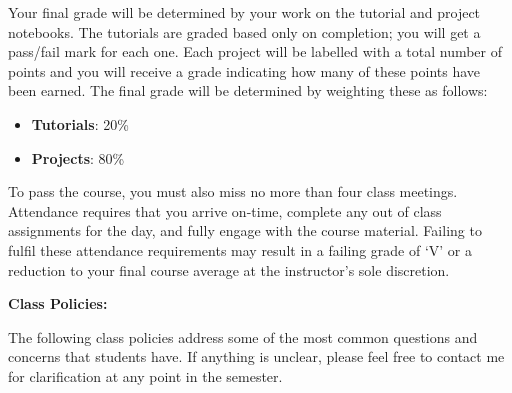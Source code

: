 \documentclass[12pt]{article}
\begin{document}
Your final grade will be determined by your work on the tutorial and project
notebooks. The tutorials are graded based only on completion; you will get a
pass/fail mark for each one. Each project will be labelled with a total number
of points and you will receive a grade indicating how many of these points have
been earned. The final grade will be determined by weighting these as follows:
\begin{itemize}\setlength\itemsep{0em}
\item \textbf{Tutorials}: 20\%
\item \textbf{Projects}: 80\%
\end{itemize}
To pass the course, you must also miss no more than four class meetings.
Attendance requires that you arrive on-time, complete any out of class
assignments for the day, and fully engage with the course material.
Failing to fulfil these attendance requirements may result in a failing
grade of `V' or a reduction to your final course average at the instructor's
sole discretion.

\bigskip

\textbf{Class Policies:} \vspace{6pt}

The following class policies address some of the most common
questions and concerns that students have. If anything is
unclear, please feel free to contact me for clarification at
any point in the semester.
\end{document}
